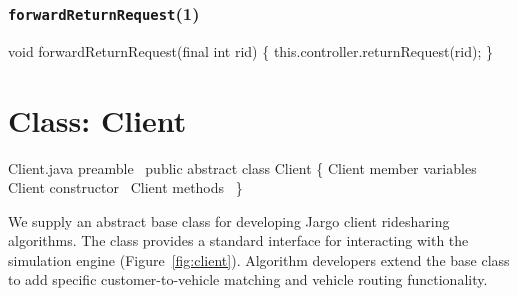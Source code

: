 \subsection{\texttt{forwardReturnRequest}(1)}
\nwenddocs{}\endmoddef{}
void forwardReturnRequest(final int rid) \{
  this.controller.returnRequest(rid);
\}
\eatline
{}\nwendcode{}\nwdocspar



\nwenddocs{}\chapter{Class: Client}
\label{client}

\nwenddocs{}\endmoddef{}
\LA{}Client.java preamble~{\nwtagstyle{}}\RA{}
public abstract class Client \{
  \LA{}\code{}Client\edoc{} member variables~{\nwtagstyle{}}\RA{}
  \LA{}\code{}Client\edoc{} constructor~{\nwtagstyle{}}\RA{}
  \LA{}\code{}Client\edoc{} methods~{\nwtagstyle{}}\RA{}
\}
\nwendcode{}\nwdocspar

We supply an abstract base class for developing Jargo client ridesharing
algorithms. The class provides a standard interface for interacting with the
simulation engine (Figure~\ref{fig:client}). Algorithm developers extend the
base class to add specific customer-to-vehicle matching and vehicle routing
functionality.

